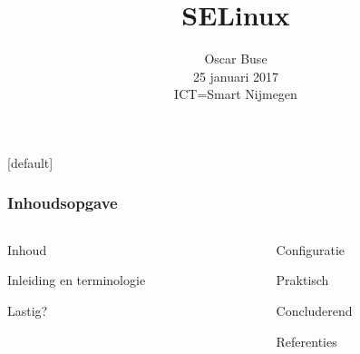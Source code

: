 \documentclass[t,handout,xcolor={dvipsnames,table}]{beamer}
\title{SELinux}
\author{Oscar Buse\\
{\small 25 januari 2017\\
ICT=Smart Nijmegen}}
\date{}
\begin{document}
[default]
    \begin{frontframe}
        \titlepage
    \end{frontframe}

    \begin{sectionframe}
    \frametitle{Inhoudsopgave}
\vspace{-14pt}
    \fontsize{6}{9}\selectfont
    \begin{columns}[t]
        \begin{column}{.5\textwidth}
        		\begin{block}{Inhoud}
                    \tableofcontents[sections={1}]
        		\end{block}
                \begin{block}{Inleiding en terminologie}
                        \tableofcontents[sections={2}]
                \end{block}
                \begin{block}{Lastig?}
                         \tableofcontents[sections={3}]
                \end{block}
        \end{column}
        \begin{column}{.5\textwidth}
                \begin{block}{Configuratie}
                         \tableofcontents[sections={4}]
                \end{block}
                \begin{block}{Praktisch}
                         \tableofcontents[sections={5}]
                \end{block}
                \begin{block}{Concluderend}
                         \tableofcontents[sections={6}]
                \end{block}
                \begin{block}{Referenties}
                         \tableofcontents[sections={7}]
                \end{block}
        \end{column}
    \end{columns}
    \end{sectionframe}



    
%	
\end{document}
